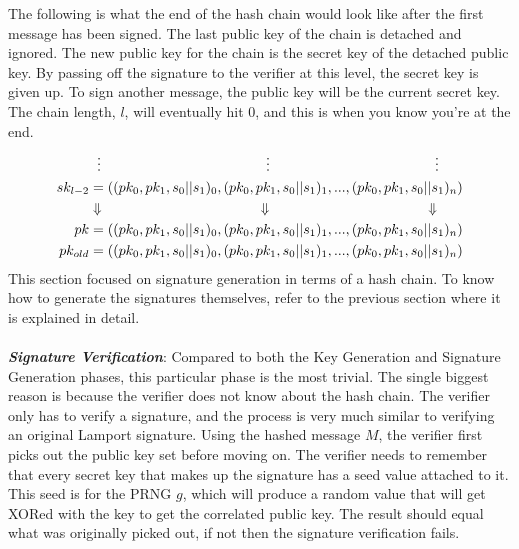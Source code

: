 \documentclass[]{scrartcl}
\makeatletter
\newcommand{\mathcenter}{\@fleqnfalse}
\makeatother
\begin{document}
The following is what the end of the hash chain would look like after the first message has been signed. The last public key of the chain is detached and ignored. The new public key for the chain is the secret key of the detached public key. By passing off the signature to the verifier at this level, the secret key is given up. To sign another message, the public key will be the current secret key. The chain length, $l$, will eventually hit 0, and this is when you know you're at the end.
\mathcenter
\begin{equation}
\begin{split}
& \hspace{0.2cm}\vdots \hspace{4.15cm}\vdots \hspace{4.15cm}\vdots \\
sk_{l-2} & = ((pk_0, pk_1, s_0||s_1)_0,(pk_0, pk_1, s_0||s_1)_1,...,(pk_0, pk_1, s_0||s_1)_n) \\
& \Downarrow \hspace{4cm}\Downarrow \hspace{4cm}\Downarrow \\
pk & = ((pk_0, pk_1, s_0||s_1)_0,(pk_0, pk_1, s_0||s_1)_1,...,(pk_0, pk_1, s_0||s_1)_n) \\
pk_{old} & = ((pk_0, pk_1, s_0||s_1)_0,(pk_0, pk_1, s_0||s_1)_1,...,(pk_0, pk_1, s_0||s_1)_n)
\end{split}
\end{equation}
This section focused on signature generation in terms of a hash chain. To know how to generate the signatures themselves, refer to the previous section where it is explained in detail.\\ \\
\textbf{\textit{Signature Verification}}: Compared to both the Key Generation and Signature Generation phases, this particular phase is the most trivial. The single biggest reason is because the verifier does not know about the hash chain. The verifier only has to verify a signature, and the process is very much similar to verifying an original Lamport signature. Using the hashed message $M$, the verifier first picks out the public key set before moving on. The verifier needs to remember that every secret key that makes up the signature has a seed value attached to it. This seed is for the PRNG $g$, which will produce a random value that will get XORed with the key to get the correlated public key. The result should equal what was originally picked out, if not then the signature verification fails.
\end{document}
